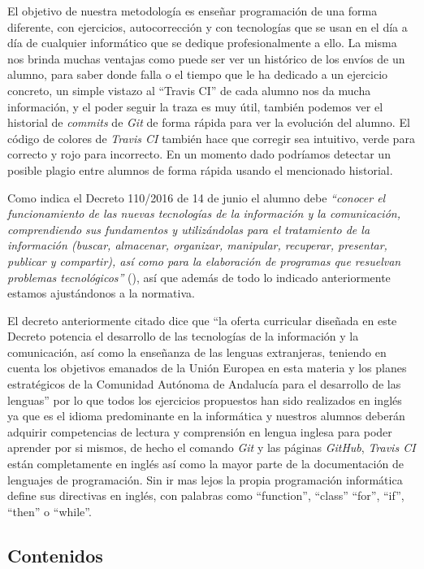 \bigskip
El objetivo de nuestra metodología es enseñar programación de una forma diferente, con ejercicios, autocorrección y con tecnologías que se usan en el día a día de cualquier informático que se dedique profesionalmente a ello. La misma nos brinda muchas ventajas como puede ser ver un histórico de los envíos de un alumno, para saber donde falla o el tiempo que le ha dedicado a un ejercicio concreto, un simple vistazo al ``Travis CI'' de cada alumno nos da mucha información, y el poder seguir la traza es muy útil, también podemos ver el historial de \textit{commits} de \textit{Git} de forma rápida para ver la evolución del alumno. El código de colores de \textit{Travis CI} también hace que corregir sea intuitivo, verde para correcto y rojo para incorrecto. En un momento dado podríamos detectar un posible plagio entre alumnos de forma rápida usando el mencionado historial.

\bigskip
Como indica el Decreto 110/2016  de 14 de junio el alumno debe \textit{``conocer el funcionamiento de las nuevas tecnologías de la información y la comunicación, comprendiendo sus fundamentos y utilizándolas para el tratamiento de la información (buscar, almacenar, organizar, manipular, recuperar, presentar, publicar y compartir), así como para la elaboración de programas que resuelvan problemas tecnológicos''} (\cite{junta_de_andalucia_decreto_2016}), así que además de todo lo indicado anteriormente estamos ajustándonos a la normativa.

\bigskip
El decreto anteriormente citado dice que ``la oferta curricular diseñada en este Decreto potencia el desarrollo de las tecnologías de la información y la comunicación, así como la enseñanza de las lenguas extranjeras, teniendo en cuenta los objetivos emanados de la Unión Europea en esta materia y los planes estratégicos de la Comunidad Autónoma de Andalucía para el desarrollo de las lenguas'' por lo que todos los ejercicios propuestos han sido realizados en inglés ya que es el idioma predominante en la informática y nuestros alumnos deberán adquirir competencias de lectura y comprensión en lengua inglesa para poder aprender por si mismos, de hecho el comando \textit{Git} y las páginas \textit{GitHub}, \textit{Travis CI} están completamente en inglés así como la mayor parte de la documentación de lenguajes de programación. Sin ir mas lejos la propia programación informática define sus directivas en inglés, con palabras como ``function'', ``class'' ``for'', ``if'', ``then'' o ``while''.

\subsection{Contenidos}

